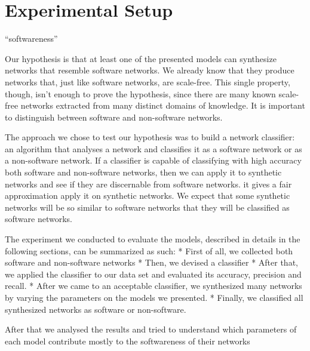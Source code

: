 
\section{Experimental Setup}


``softwareness''

Our hypothesis is that at least one of the presented models can synthesize
networks that resemble software networks. We already know that they produce
networks that, just like software networks, are scale-free. This single
property, though, isn't enough to prove the hypothesis, since there are many
known scale-free networks extracted from many distinct domains of knowledge. It
is important to distinguish between software and non-software networks.


The approach we chose to test our hypothesis was to build a network classifier:
an algorithm that analyses a network and classifies it as a software network or
as a non-software network. If a classifier is capable of classifying with high
accuracy both software and non-software networks, then we can apply it to
synthetic networks and see if they are discernable from software networks.
it gives a fair approximation apply it on synthetic networks. We expect that
some synthetic networks will be so similar to software networks that they will
be classified as software networks.

The experiment we conducted to evaluate the models, described in details in the
following sections, can be summarized as such:
* First of all, we collected both software and non-software networks
* Then, we devised a classifier
* After that, we applied the classifier to our data set and evaluated its
accuracy, precision and recall.
* After we came to an acceptable classifier, we synthesized many networks by
varying the parameters on the models we presented.
* Finally, we classified all synthesized networks as software or non-software.

After that we analysed the results and tried to understand which parameters
of each model contribute mostly to the softwareness of their networks

